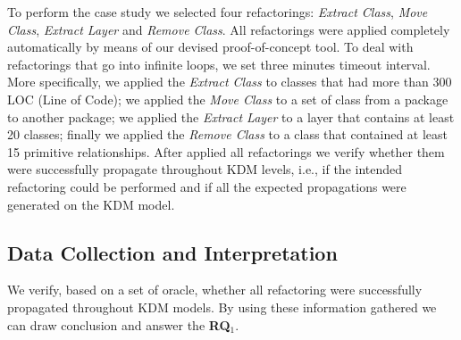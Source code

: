 To perform the case study we selected four refactorings: \textit{Extract Class}, \textit{Move Class}, \textit{Extract Layer} and \textit{Remove Class}. %
All refactorings were applied completely automatically by means of our devised proof-of-concept tool. To deal with refactorings that go into infinite loops, we set three minutes timeout interval. More specifically, we applied the \textit{Extract Class} to classes that had more than 300 LOC (Line of Code); we applied the \textit{Move Class} to a set of class from a package to another package; we applied the \textit{Extract Layer} to a layer that contains at least 20 classes; finally we applied the \textit{Remove Class} to a class that contained at least 15 primitive relationships. After applied all refactorings we verify whether them were successfully propagate throughout KDM levels, i.e., if the intended refactoring could be performed and if all the expected propagations were generated on the KDM model. 

\subsection{Data Collection and Interpretation}

We verify, based on a set of oracle, whether all refactoring were successfully propagated throughout KDM models. By using these information gathered we can draw conclusion and answer the \textbf{RQ$_1$}.


